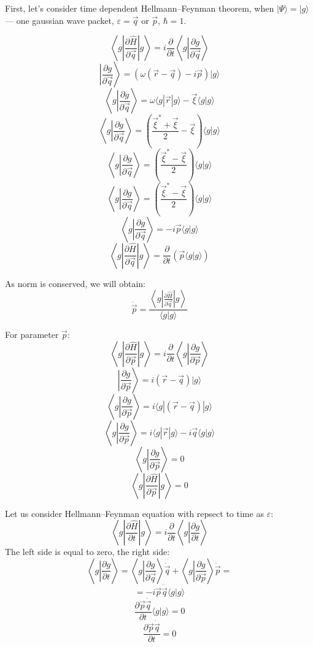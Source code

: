 First, let's consider time dependent Hellmann--Feynman theorem, 
when $|\Psi\rangle=|g\rangle$ --- one gaussian wave packet, 
$\varepsilon = \vec{q}$ or $\vec{p}$, $\hbar=1$.

$$\left\langle g\left|\frac{\partial\hat{H}}{\partial \vec{q}}\right|g\right\rangle=i\frac{\partial}{\partial t}\left\langle g\left|\frac{\partial g}{\partial \vec{q}}\right.\right\rangle$$
$$\left|\frac{\partial g}{\partial \vec{q}}\right\rangle = (\omega(\vec{r}-\vec{q})-i\vec{p})|g\rangle$$
$$\left\langle g\left|\frac{\partial g}{\partial\vec{q}}\right.\right\rangle = \omega\langle g|\vec{r}|g\rangle - \vec{\xi}\langle g|g\rangle$$
$$\left\langle g\left|\frac{\partial g}{\partial\vec{q}}\right.\right\rangle = \left(\frac{\vec{\xi}^*+\vec{\xi}}{2} -\vec{\xi}\right)\langle g|g\rangle$$
$$\left\langle g\left|\frac{\partial g}{\partial\vec{q}}\right.\right\rangle = \left(\frac{\vec{\xi}^*-\vec{\xi}}{2}\right)\langle g|g\rangle$$
$$\left\langle g\left|\frac{\partial g}{\partial\vec{q}}\right.\right\rangle = \left(\frac{\vec{\xi}^*-\vec{\xi}}{2}\right)\langle g|g\rangle$$
$$\left\langle g\left|\frac{\partial g}{\partial\vec{q}}\right.\right\rangle = -i\vec{p}\langle g|g\rangle$$
$$\left\langle g\left|\frac{\partial\hat{H}}{\partial \vec{q}}\right|g\right\rangle=\frac{\partial}{\partial t} \left(\vec{p}\langle g|g\rangle\right)$$

As norm is conserved, we will obtain:
$$\dot{\vec{p}}=\frac{\left\langle g\left|\frac{\partial\hat{H}}{\partial \vec{q}}\right|g\right\rangle}{\langle g|g\rangle}$$

For parameter $\vec{p}$:
$$\left\langle g\left|\frac{\partial\hat{H}}{\partial \vec{p}}\right|g\right\rangle=i\frac{\partial}{\partial t}\left\langle g\left|\frac{\partial g}{\partial \vec{p}}\right.\right\rangle$$
$$\left|\frac{\partial g}{\partial \vec{p}}\right\rangle = i(\vec{r}-\vec{q})|g\rangle$$
$$\left\langle g\left|\frac{\partial g}{\partial \vec{p}}\right.\right\rangle = i\langle g|(\vec{r}-\vec{q})|g\rangle$$
$$\left\langle g\left|\frac{\partial g}{\partial \vec{p}}\right.\right\rangle = i\langle g|\vec{r}|g\rangle-i\vec{q}\langle g|g\rangle$$
$$\left\langle g\left|\frac{\partial g}{\partial \vec{p}}\right.\right\rangle = 0 $$
$$\left\langle g\left|\frac{\partial\hat{H}}{\partial \vec{p}}\right|g\right\rangle=0$$

Let us consider Hellmann--Feynman equation with repsect to time as $\varepsilon$:
$$\left\langle g\left|\frac{\partial\hat{H}}{\partial t}\right|g\right\rangle=i\frac{\partial}{\partial t}\left\langle g\left|\frac{\partial g}{\partial t}\right.\right\rangle$$
The left side is equal to zero, the right side:
$$\left\langle g\left|\frac{\partial g}{\partial t}\right.\right\rangle = %
  \left\langle g\left|\frac{\partial g}{\partial \vec{q}}\right.\right\rangle\dot{\vec{q}} + %
  \left\langle g\left|\frac{\partial g}{\partial \vec{p}}\right.\right\rangle\dot{\vec{p}}=$$
$$=-i\vec{p}\dot{\vec{q}}\langle g|g\rangle$$
$$\frac{\partial\vec{p}\dot{\vec{q}}}{\partial t}\langle g|g\rangle = 0$$
$$\frac{\partial \vec{p}\dot{\vec{q}}}{\partial t}=0$$

